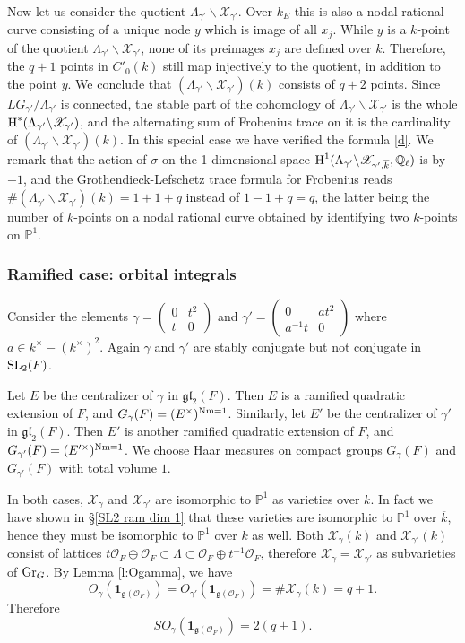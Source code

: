 \documentclass[]{pcmi}
\let\oldsubsubsection\subsubsection
\renewcommand{\subsubsection}[1]{%
\setcounter{subsubsection}{\value{equation}}%
\oldsubsubsection{#1}%
\refstepcounter{equation}%
}
\theoremstyle{plain}
\theoremstyle{definition}
\def\PP{\mathbb{P}}
\def\QQ{\mathbb{Q}}
\def\calO{\mathcal{O}}
\newcommand{\sX}{\ensuremath{\mathscr{X}}\xspace}
\newcommand{\sX}{\ensuremath{\mathcal{X}}\xspace}
\newcommand\frg{\mathfrak{g}}
\newcommand{\Gr}{\textup{Gr}}
\newcommand{\Nm}{\textup{Nm}}
\newcommand\gl{\mathfrak{gl}}
\newcommand\SL{\textup{SL}}
\renewcommand{\L}{\Lambda}
\newcommand{\one}{\mathbf{1}}
\newcommand{\Ql}{\QQ_{\ell}}
\newcommand{\bs}{\backslash}
\newcommand\mat[4]{\left(\begin{array}{cc} #1 & #2 \\ #3 & #4 \end{array}\right)}  %
\newcommand{\cohog}[2]{\textup{H}^{#1}({#2})}     %
\newcommand{\kbar}{\overline{k}}
\begin{document}
Now let us consider the quotient $\L_{\gamma'}\bs\sX_{\gamma'}$. Over $k_{E}$ this is also a nodal rational curve consisting of a unique node $y$ which is image of all $x_{j}$. While $y$ is a $k$-point of the quotient $\L_{\gamma'}\bs\sX_{\gamma'}$, none of its preimages $x_{j}$ are defined over $k$. Therefore, the $q+1$ points in $C'_{0}(k)$ still map injectively to the quotient, in addition to the point $y$. We conclude that $(\L_{\gamma'}\bs\sX_{\gamma'})(k)$ consists of $q+2$ points.  Since $LG_{\gamma'}/\L_{\gamma'}$ is connected, the stable part of the cohomology of $\L_{\gamma'}\bs\sX_{\gamma'}$ is the whole $\cohog{*}{\L_{\gamma'}\bs\sX_{\gamma'}}$, and the alternating sum of Frobenius trace on it is the cardinality of $(\L_{\gamma'}\bs\sX_{\gamma'})(k)$. In this special case we have verified the formula \eqref{d}. We remark that the action of $\sigma$ on the 1-dimensional space $\cohog{1}{\L_{\gamma'}\bs\sX_{\gamma',\kbar},\Ql}$ is by $-1$, and the Grothendieck-Lefschetz trace formula for Frobenius reads $\#(\L_{\gamma'}\bs\sX_{\gamma'})(k)= 1+1+q$ instead of $1-1+q=q$, the latter being the number of $k$-points on a nodal rational curve obtained by identifying two $k$-points on $\PP^{1}$.


\subsubsection{Ramified case: orbital integrals}\label{sss:ram orb SL2} Consider the elements $\gamma=\mat{0}{t^{2}}{t}{0}$ and $\gamma'=\mat{0}{at^{2}}{a^{-1}t}{0}$ where $a\in k^{\times}-(k^{\times})^{2}$. Again $\gamma$ and $\gamma'$ are stably conjugate but not conjugate in $\SL_{2}(F)$. 

Let $E$ be the centralizer of $\gamma$ in $\gl_{2}(F)$. Then $E$ is a ramified quadratic extension of $F$, and $G_{\gamma}(F)=(E^{\times})^{\Nm=1}$. Similarly, let $E'$ be the centralizer of $\gamma'$ in $\gl_{2}(F)$. Then $E'$ is another ramified quadratic extension of $F$, and $G_{\gamma'}(F)=(E'^{\times})^{\Nm=1}$. We choose Haar measures on compact groups $G_{\gamma}(F)$ and $G_{\gamma'}(F)$ with total volume $1$.  

In both cases, $\sX_{\gamma}$ and $\sX_{\gamma'}$ are isomorphic to $\PP^{1}$ as varieties over $k$. In fact we have shown in \S\ref{SL2 ram dim 1} that these varieties are isomorphic to $\PP^{1}$ over $\kbar$, hence they must be isomorphic to $\PP^{1}$ over $k$ as well.  Both $\sX_{\gamma}(k)$ and $\sX_{\gamma'}(k)$  consist of lattices $t\calO_{F}\oplus\calO_{F}\subset \L\subset \calO_{F}\oplus t^{-1}\calO_{F}$, therefore $\sX_{\gamma}=\sX_{\gamma'}$ as subvarieties of $\Gr_{G}$. By Lemma \ref{l:Ogamma}, we have
\begin{equation*}
O_{\gamma}(\one_{\frg(\calO_{F})})=O_{\gamma'}(\one_{\frg(\calO_{F})})=\#\sX_{\gamma}(k)=q+1.
\end{equation*}
Therefore
\begin{equation}\label{ram so}
SO_{\gamma}(\one_{\frg(\calO_{F})})=2(q+1).
\end{equation}
\end{document}
